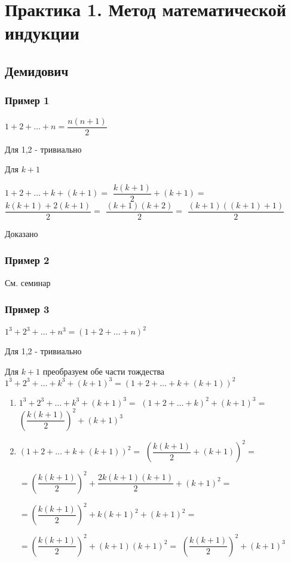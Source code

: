 \section{Практика 1. Метод математической индукции}

\subsection{Демидович}

\subsubsection{Пример 1}

$ 1 + 2 + \ldots + n = \dfrac{n(n+1)}{2} $

Для 1,2 - тривиально

Для $ k+1 $

$ 1 + 2 + \ldots + k + (k+1) = $
$ \dfrac{k(k+1)}{2} + (k+1) =  $
$ \dfrac{k(k+1) + 2(k+1)}{2} = $
$\dfrac{(k+1)(k+2)}{2} =$
$\dfrac{(k+1)((k+1) + 1)}{2}$

Доказано

\subsubsection{Пример 2}

См. семинар

\subsubsection{Пример 3}

$ 1^{3} + 2^{3} + \ldots + n^{3} = (1 + 2 + \ldots + n)^{2} $

Для 1,2 - тривиально

Для $ k+1 $ преобразуем обе части тождества
$ 1^{3} + 2^{3} + \ldots + k^{3} + (k+1)^{3} = (1 + 2 + \ldots + k + (k+1))^{2} $

\begin{enumerate}

\item 
$ 1^{3} + 2^{3} + \ldots + k^{3} + (k+1)^{3} =$
$ (1 + 2 + \ldots + k)^{2} + (k+1)^{3} = $
$ \left( \dfrac{k(k+1)}{2} \right)^{2} + (k+1)^{3}  $

\item 
$ (1 + 2 + \ldots + k + (k+1))^{2} = $
$   \left( \dfrac{k(k+1)}{2} + (k+1) \right)^{2} = $

$ = \left( \dfrac{k(k+1)}{2} \right)^{2} + \dfrac{2k(k+1)(k+1)}{2} + (k+1)^{2} = $

$  = \left( \dfrac{k(k+1)}{2} \right)^{2} + k(k+1)^{2} + (k+1)^{2} =  $

$  = \left( \dfrac{k(k+1)}{2} \right)^{2} + (k+1)(k+1)^{2} =  $
$  \left( \dfrac{k(k+1)}{2} \right)^{2} + (k+1)^{3} $
\end{enumerate}

